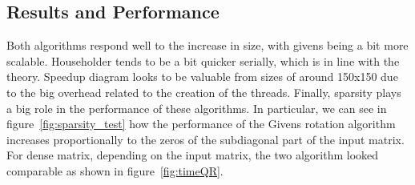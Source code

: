 \documentclass{article}
\begin{document}
\subsection{Results and Performance}
Both algorithms respond well to the increase in size, with givens being a bit more scalable. Householder tends to be a bit quicker serially, which is in line with the theory.
Speedup diagram looks to be valuable from sizes of around 150x150 due to the big overhead related to the creation of the threads.
Finally, sparsity plays a big role in the performance of these algorithms. In particular, we can see in figure~\ref{fig:sparsity_test} how the performance of the Givens rotation algorithm increases proportionally to the zeros of the subdiagonal part of the input matrix. For dense matrix, depending on the input matrix, the two algorithm looked comparable as shown in figure~\ref{fig:timeQR}.
\end{document}
